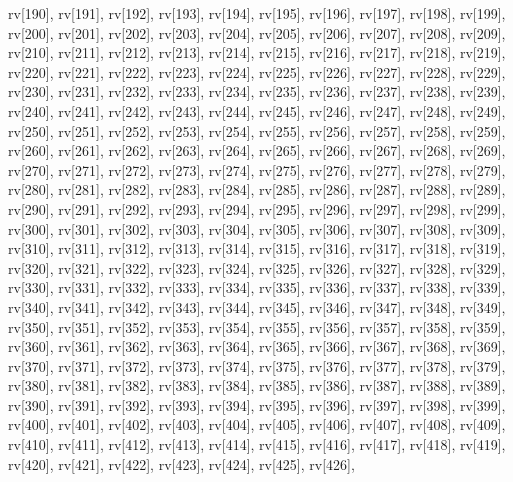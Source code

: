 \begin{DoxyCode}
{  rv[190],
  rv[191],
  rv[192],
  rv[193],
  rv[194],
  rv[195],
  rv[196],
  rv[197],
  rv[198],
  rv[199],
  rv[200],
  rv[201],
  rv[202],
  rv[203],
  rv[204],
  rv[205],
  rv[206],
  rv[207],
  rv[208],
  rv[209],
  rv[210],
  rv[211],
  rv[212],
  rv[213],
  rv[214],
  rv[215],
  rv[216],
  rv[217],
  rv[218],
  rv[219],
  rv[220],
  rv[221],
  rv[222],
  rv[223],
  rv[224],
  rv[225],
  rv[226],
  rv[227],
  rv[228],
  rv[229],
  rv[230],
  rv[231],
  rv[232],
  rv[233],
  rv[234],
  rv[235],
  rv[236],
  rv[237],
  rv[238],
  rv[239],
  rv[240],
  rv[241],
  rv[242],
  rv[243],
  rv[244],
  rv[245],
  rv[246],
  rv[247],
  rv[248],
  rv[249],
  rv[250],
  rv[251],
  rv[252],
  rv[253],
  rv[254],
  rv[255],
  rv[256],
  rv[257],
  rv[258],
  rv[259],
  rv[260],
  rv[261],
  rv[262],
  rv[263],
  rv[264],
  rv[265],
  rv[266],
  rv[267],
  rv[268],
  rv[269],
  rv[270],
  rv[271],
  rv[272],
  rv[273],
  rv[274],
  rv[275],
  rv[276],
  rv[277],
  rv[278],
  rv[279],
  rv[280],
  rv[281],
  rv[282],
  rv[283],
  rv[284],
  rv[285],
  rv[286],
  rv[287],
  rv[288],
  rv[289],
  rv[290],
  rv[291],
  rv[292],
  rv[293],
  rv[294],
  rv[295],
  rv[296],
  rv[297],
  rv[298],
  rv[299],
  rv[300],
  rv[301],
  rv[302],
  rv[303],
  rv[304],
  rv[305],
  rv[306],
  rv[307],
  rv[308],
  rv[309],
  rv[310],
  rv[311],
  rv[312],
  rv[313],
  rv[314],
  rv[315],
  rv[316],
  rv[317],
  rv[318],
  rv[319],
  rv[320],
  rv[321],
  rv[322],
  rv[323],
  rv[324],
  rv[325],
  rv[326],
  rv[327],
  rv[328],
  rv[329],
  rv[330],
  rv[331],
  rv[332],
  rv[333],
  rv[334],
  rv[335],
  rv[336],
  rv[337],
  rv[338],
  rv[339],
  rv[340],
  rv[341],
  rv[342],
  rv[343],
  rv[344],
  rv[345],
  rv[346],
  rv[347],
  rv[348],
  rv[349],
  rv[350],
  rv[351],
  rv[352],
  rv[353],
  rv[354],
  rv[355],
  rv[356],
  rv[357],
  rv[358],
  rv[359],
  rv[360],
  rv[361],
  rv[362],
  rv[363],
  rv[364],
  rv[365],
  rv[366],
  rv[367],
  rv[368],
  rv[369],
  rv[370],
  rv[371],
  rv[372],
  rv[373],
  rv[374],
  rv[375],
  rv[376],
  rv[377],
  rv[378],
  rv[379],
  rv[380],
  rv[381],
  rv[382],
  rv[383],
  rv[384],
  rv[385],
  rv[386],
  rv[387],
  rv[388],
  rv[389],
  rv[390],
  rv[391],
  rv[392],
  rv[393],
  rv[394],
  rv[395],
  rv[396],
  rv[397],
  rv[398],
  rv[399],
  rv[400],
  rv[401],
  rv[402],
  rv[403],
  rv[404],
  rv[405],
  rv[406],
  rv[407],
  rv[408],
  rv[409],
  rv[410],
  rv[411],
  rv[412],
  rv[413],
  rv[414],
  rv[415],
  rv[416],
  rv[417],
  rv[418],
  rv[419],
  rv[420],
  rv[421],
  rv[422],
  rv[423],
  rv[424],
  rv[425],
  rv[426],
}
\end{DoxyCode}
